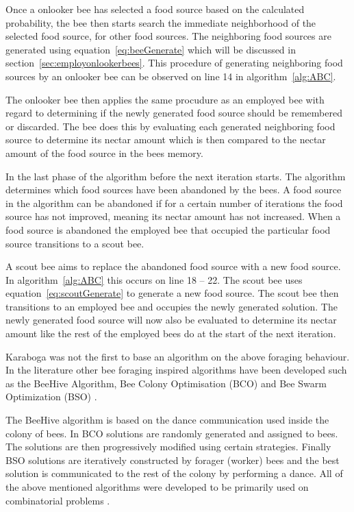 Once a onlooker bee has selected a food source based on the calculated probability, the bee then starts search the immediate neighborhood of the selected food source, for other food sources. The neighboring food sources are generated using equation~\ref{eq:beeGenerate} which will be discussed in section~\ref{sec:employonlookerbees}. This procedure of generating neighboring food sources by an onlooker bee can be observed on line 14 in algorithm~\ref{alg:ABC}.

The onlooker bee then applies the same procudure as an employed bee with regard to determining if the newly generated food source should be remembered or discarded. The bee does this by evaluating each generated neighboring food source to determine its nectar amount which is then compared to the nectar amount of the food source in the bees memory.

In the last phase of the algorithm before the next iteration starts. The algorithm determines which food sources have been abandoned by the bees. A food source in the algorithm can be abandoned if for a certain number of iterations the food source has not improved, meaning its nectar amount has not increased. When a food source is abandoned the employed bee that occupied the particular food source transitions to a scout bee.

A scout bee aims to replace the abandoned food source with a new food source. In algorithm~\ref{alg:ABC} this occurs on line 18 -- 22. The scout bee uses equation~\ref{eq:scoutGenerate} to generate a new food source. The scout bee then transitions to an employed bee and occupies the newly generated solution. The newly generated food source will now also be evaluated to determine its nectar amount like the rest of the employed bees do at the start of the next iteration.

Karaboga was not the first to base an algorithm on the above foraging behaviour. In the literature other bee foraging inspired algorithms have been developed such as the BeeHive Algorithm, Bee Colony Optimisation (BCO) and Bee Swarm Optimization (BSO) \cite{BCO,HybridABCClustering,ABCNumericalOptimization}. 

The BeeHive algorithm is based on the dance communication used inside the colony of bees. In BCO solutions are randomly generated and assigned to bees\cite{HybridABCClustering,ABCNumericalOptimization}. The solutions are then progressively modified using certain strategies. Finally BSO solutions are iteratively constructed by forager (worker) bees and the best solution is communicated to the rest of the colony by performing a dance\cite{HybridABCClustering,ABCNumericalOptimization}. All of the above mentioned algorithms were developed to be primarily used on combinatorial problems \cite{ABCCompareStudy}.

